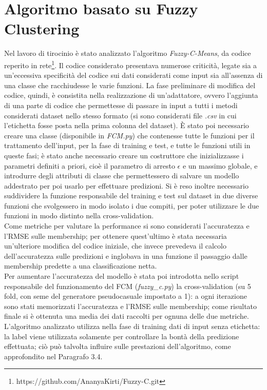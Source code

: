 \documentclass[oneside, openany]{book}
\begin{document}
	\section{Algoritmo basato su Fuzzy Clustering}
	Nel lavoro di tirocinio è stato analizzato l'algoritmo \textit{Fuzzy-C-Means}, da codice reperito in rete\footnote{https://github.com/AnanyaKirti/Fuzzy-C.git}. Il codice considerato presentava numerose criticità, legate sia a un'eccessiva specificità del codice sui dati considerati come input sia all'assenza di una classe che racchiudesse le varie funzioni. La fase preliminare di modifica del codice, quindi, è consistita nella realizzazione di un'adattatore, ovvero l'aggiunta di una parte di codice che permettesse di passare in input a tutti i metodi considerati dataset nello stesso formato (si sono considerati file \textit{.csv} in cui l'etichetta fosse posta nella prima colonna del dataset). \`E stato poi necessario creare una classe (disponibile in \textit{FCM.py}) che contenesse tutte le funzioni per il trattamento dell'input, per la fase di training e test, e tutte le funzioni utili in queste fasi; è stato anche necessario creare un costruttore che inizializzasse i parametri definiti a priori, cioè il parametro di arresto $\epsilon$ e un massimo globale, e introdurre degli attributi di classe che permettessero di salvare un modello addestrato per poi usarlo per effettuare predizioni. Si è reso inoltre necessario suddividere la funzione responsabile del training e test sul dataset in due diverse funzioni che svolgessero in modo isolato i due compiti, per poter utilizzare le due funzioni in modo distinto nella cross-validation.\\
	Come metriche per valutare la performance si sono considerati l'accuratezza e l'RMSE sulle membership; per ottenere quest'ultimo è stata necessaria un'ulteriore modifica del codice iniziale, che invece prevedeva il calcolo dell'accuratezza sulle predizioni e inglobava in una funzione il passaggio dalle membership predette a una classificazione netta.\\ 
	Per aumentare l'accuratezza del modello è stata poi introdotta nello script responsabile del funzionamento del FCM (\textit{fuzzy\_c.py}) la cross-validation (su 5 fold, con seme del generatore pseudocasuale impostato a 1): a ogni iterazione sono stati memorizzati l'accuratezza e l'RMSE sulle membership; come risultato finale si è ottenuta una media dei dati raccolti per ognuna delle due metriche.
	L'algoritmo analizzato utilizza nella fase di training dati di input senza etichetta: la label viene utilizzata solamente per controllare la bontà della predizione effettuata; ciò può talvolta influire sulle prestazioni dell'algoritmo, come approfondito nel Paragrafo 3.4.
	
\end{document}
